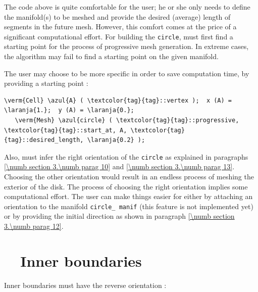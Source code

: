 The code above is quite comfortable for the user; he or she only needs to define
the manifold(s) to be meshed and provide the desired (average) length of segments
in the future mesh.
However, this comfort comes at the price of a significant computational effort.
For building the {\small\tt circle}, {\ManiFEM} must first find a starting point for the process
of progressive mesh generation.
In extreme cases, the algorithm may fail to find a starting point on the given manifold.

The user may choose to be more specific in order to save computation time,
by providing a starting point :

\begin{Verbatim}[commandchars=\\\{\},formatcom=\small\tt,
   baselinestretch=0.94,framesep=2mm                      ]
   \verm{Cell} \azul{A} ( \textcolor{tag}{tag}::vertex );  x (A) = \laranja{1.};  y (A) = \laranja{0.};
   \verm{Mesh} \azul{circle} ( \textcolor{tag}{tag}::progressive, \textcolor{tag}{tag}::start_at, A, \textcolor{tag}{tag}::desired_length, \laranja{0.2} );
\end{Verbatim}

Also, {\maniFEM} must infer the right orientation of the {\small\tt circle}
as explained in paragraphs \ref{\numb section 3.\numb parag 10} and
\ref{\numb section 3.\numb parag 13}.
Choosing the other orientation would result in an endless process of meshing the exterior of
the disk.
The process of choosing the right orientation implies some computational effort.
The user can make things easier for {\maniFEM} either by attaching an orientation
to the manifold {\small\tt circle\_\,manif} (this feature is not implemented yet) or
by providing the initial direction as shown in paragraph \ref{\numb section 3.\numb parag 12}.


\section{~~Inner boundaries}\label{\numb section 3.\numb parag 3}

Inner boundaries must have the reverse orientation :

